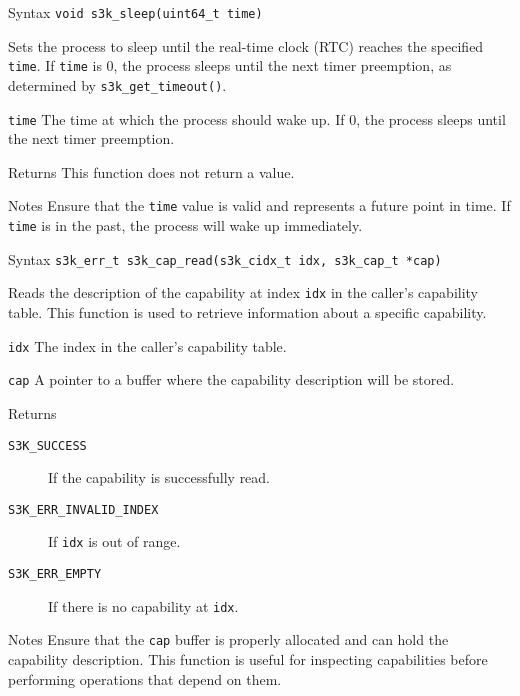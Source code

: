\documentclass[a4paper,11pt]{article}
\newenvironment{syscalldoc}[1]{
  \begin{tcolorbox}[breakable,title=\subsection{\texttt{#1()}}]
  \begin{description}[leftmargin=!,style=nextline,noitemsep]
}{
  \end{description}
  \end{tcolorbox}
}
\begin{document}
\begin{syscalldoc}{s3k\_sleep}
  \item[Syntax] \lstinline{void s3k_sleep(uint64_t time)}
  \item[Description] Sets the process to sleep until the real-time clock (RTC) reaches the specified \verb|time|. If \verb|time| is 0, the process sleeps until the next timer preemption, as determined by \verb|s3k_get_timeout()|.
  \item[Parameters]
    \begin{description}
      \item[]
      \item[\texttt{time}] The time at which the process should wake up. If 0, the process sleeps until the next timer preemption.
    \end{description}
  \item[Returns] This function does not return a value.
  \item[Notes] Ensure that the \verb|time| value is valid and represents a future point in time. If \verb|time| is in the past, the process will wake up immediately.
\end{syscalldoc}

\begin{syscalldoc}{s3k\_cap\_read}
  \item[Syntax] \lstinline{s3k_err_t s3k_cap_read(s3k_cidx_t idx, s3k_cap_t *cap)}
  \item[Description] Reads the description of the capability at index \verb|idx| in the caller's capability table. This function is used to retrieve information about a specific capability.
  \item[Parameters]
    \begin{description}
      \item[]
      \item[\texttt{idx}] The index in the caller's capability table.
      \item[\texttt{cap}] A pointer to a buffer where the capability description will be stored.
    \end{description}
  \item[Returns]
    \begin{description}
      \item[]
      \item[\texttt{S3K\_SUCCESS}] If the capability is successfully read.
      \item[\texttt{S3K\_ERR\_INVALID\_INDEX}] If \verb|idx| is out of range.
      \item[\texttt{S3K\_ERR\_EMPTY}] If there is no capability at \verb|idx|.
    \end{description}
  \item[Notes] Ensure that the \verb|cap| buffer is properly allocated and can hold the capability description. This function is useful for inspecting capabilities before performing operations that depend on them.
\end{syscalldoc}
\end{document}
